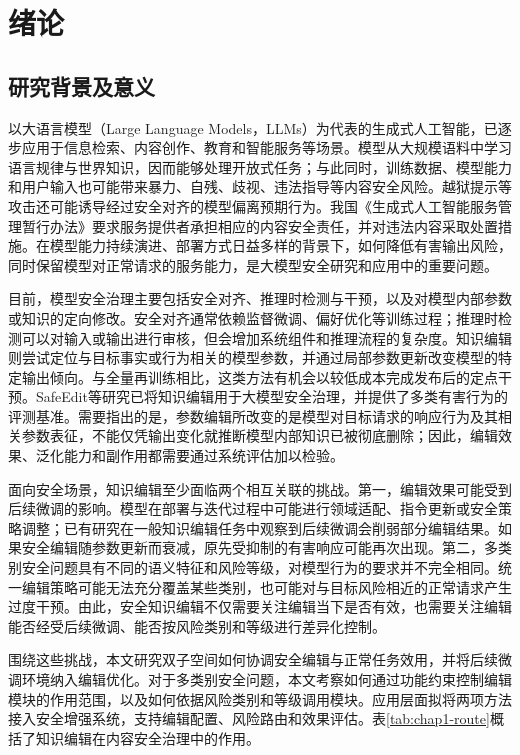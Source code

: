 \chapter{绪论}\label{chap:intro}

\section{研究背景及意义}

以大语言模型（Large Language Models，LLMs）为代表的生成式人工智能，已逐步应用于信息检索、内容创作、教育和智能服务等场景。模型从大规模语料中学习语言规律与世界知识，因而能够处理开放式任务；与此同时，训练数据、模型能力和用户输入也可能带来暴力、自残、歧视、违法指导等内容安全风险。越狱提示等攻击还可能诱导经过安全对齐的模型偏离预期行为\cite{zou2023gcg}。我国《生成式人工智能服务管理暂行办法》要求服务提供者承担相应的内容安全责任，并对违法内容采取处置措施\cite{cac2023measures}。在模型能力持续演进、部署方式日益多样的背景下，如何降低有害输出风险，同时保留模型对正常请求的服务能力，是大模型安全研究和应用中的重要问题。

目前，模型安全治理主要包括安全对齐、推理时检测与干预，以及对模型内部参数或知识的定向修改。安全对齐通常依赖监督微调、偏好优化等训练过程；推理时检测可以对输入或输出进行审核，但会增加系统组件和推理流程的复杂度\cite{ouyang2022instruct,rafailov2023dpo,inan2023llamaguard}。知识编辑则尝试定位与目标事实或行为相关的模型参数，并通过局部参数更新改变模型的特定输出倾向\cite{zhang2024comprehensive,meng2022rome,meng2023memit}。与全量再训练相比，这类方法有机会以较低成本完成发布后的定点干预。SafeEdit等研究已将知识编辑用于大模型安全治理，并提供了多类有害行为的评测基准\cite{wang2024safeedit}。需要指出的是，参数编辑所改变的是模型对目标请求的响应行为及其相关参数表征，不能仅凭输出变化就推断模型内部知识已被彻底删除；因此，编辑效果、泛化能力和副作用都需要通过系统评估加以检验。

面向安全场景，知识编辑至少面临两个相互关联的挑战。第一，编辑效果可能受到后续微调的影响。模型在部署与迭代过程中可能进行领域适配、指令更新或安全策略调整；已有研究在一般知识编辑任务中观察到后续微调会削弱部分编辑结果\cite{cheng2025finetune}。如果安全编辑随参数更新而衰减，原先受抑制的有害响应可能再次出现。第二，多类别安全问题具有不同的语义特征和风险等级，对模型行为的要求并不完全相同。统一编辑策略可能无法充分覆盖某些类别，也可能对与目标风险相近的正常请求产生过度干预。由此，安全知识编辑不仅需要关注编辑当下是否有效，也需要关注编辑能否经受后续微调、能否按风险类别和等级进行差异化控制。

围绕这些挑战，本文研究双子空间如何协调安全编辑与正常任务效用，并将后续微调环境纳入编辑优化。对于多类别安全问题，本文考察如何通过功能约束控制编辑模块的作用范围，以及如何依据风险类别和等级调用模块。应用层面拟将两项方法接入安全增强系统，支持编辑配置、风险路由和效果评估。表\ref{tab:chap1-route}概括了知识编辑在内容安全治理中的作用。

